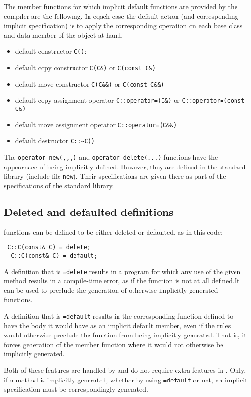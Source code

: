 The member functions for which implicit default functions are provided by the compiler are the following. In eqach case the default action (and corresponding implicit specification) is to apply the corresponding operation on each base class and data member of the object at hand.
\begin{itemize}
	\item default constructor \lstinline|C()|: 
	\item default copy constructor \lstinline|C(C&)| or \lstinline|C(const C&)|
	\item default move constructor \lstinline|C(C&&)| or \lstinline|C(const C&&)|
	\item default copy assignment operator \lstinline|C::operator=(C&)| or \lstinline|C::operator=(const C&)|
	\item default move assignment operator \lstinline|C::operator=(C&&)| 
	\item default destructor \lstinline|C::~C()|
\end{itemize}

The \lstinline|operator new(,,,)| and 
\lstinline|operator delete(...)| functions have the appearnace of being implicitly defined. However, they are defined in the standard library
(include file \lstinline|new|). Their specifications are given there as
part of the specifications of the standard library.

\subsection{Deleted and defaulted definitions}

 \lang{} functions can be defined to be either deleted or defaulted, as in this code:
 \begin{lstlisting}
 C::C(const& C) = delete; 
  C::C(const& C) = default; 
 \end{lstlisting}
 A definition that is \lstinline|=delete| results in a program for which any use of the given method results in a compile-time error,
 as if the function is not at all defined.It can be used to preclude the
 generation of otherwise implicitly generated functions.
 
 A definition that is \lstinline|=default| results in the corresponding
 function defined to have the body it would have as an implicit default
 member, even if the \lang{} rules would otherwise preclude the 
 function from being implicitly generated. That is, it forces 
 generation of the member function where it would not otherwise be implicitly generated.
 
Both of these features are handled by \lang{} and do not require 
extra features in \NAME{}. Only, if a method is implicitly generated, whether by using \lstinline|=default| or not, an implicit specification must be correspondingly generated.
